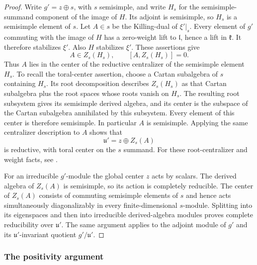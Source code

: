 \begin{proof}
Write $g'=z\oplus s$, with $s$ semisimple, and write $H_s$ for the
semisimple-summand component of the image of $H$. Its adjoint is
semisimple, so $H_s$ is a semisimple element of $s$. Let $A\in s$
be the Killing-dual of $\xi'|_s$. Every element of $g'$ commuting
with the image of $H$ has a zero-weight lift to
$\mathfrak l$, hence a lift in $\mathfrak k$. It therefore
stabilizes $\xi'$. Also $H$ stabilizes $\xi'$. These assertions
give
\[
 A\in Z_s(H_s),\qquad
 [A,Z_s(H_s)]=0.
\]
Thus $A$ lies in the center of the reductive centralizer of the
semisimple element $H_s$. To recall the toral-center assertion,
choose a Cartan subalgebra of $s$ containing $H_s$. Its root
decomposition describes $Z_s(H_s)$ as that Cartan subalgebra plus
the root spaces whose roots vanish on $H_s$. The resulting root
subsystem gives its semisimple derived algebra, and its center is
the subspace of the Cartan subalgebra annihilated by this subsystem.
Every element of this center is therefore semisimple. In particular
$A$ is semisimple. Applying the same centralizer description to $A$
shows that
\[
 \mathfrak u'=z\oplus Z_s(A)
\]
is reductive, with toral center on the $s$ summand.
For these root-centralizer and weight facts, see
\citet[Theorems~6.30, 6.38 and~8.2]{KirillovPreliminary}.

For an irreducible $g'$-module the global center $z$ acts by scalars.
The derived algebra of $Z_s(A)$ is semisimple, so its action is
completely reducible. The center of $Z_s(A)$ consists of commuting
semisimple elements of $s$ and hence acts simultaneously
diagonalizably in every finite-dimensional $s$-module. Splitting
into its eigenspaces and then into irreducible derived-algebra
modules proves complete reducibility over $\mathfrak u'$.
The same argument applies to the adjoint module of $g'$ and its
$\mathfrak u'$-invariant quotient $g'/\mathfrak u'$.
\end{proof}

\subsubsection{The positivity argument}

